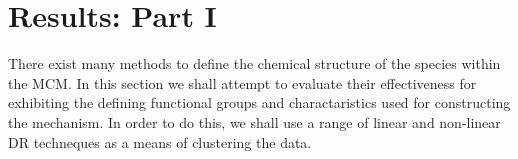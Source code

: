 \section{Results: Part I}

There exist many methods to define the chemical structure of the species within the MCM. In this section we shall attempt to evaluate their effectiveness for exhibiting the defining functional groups and charactaristics used for constructing the mechanism. In order to do this, we shall use a range of linear and non-linear DR techneques as a means of clustering the data. 
